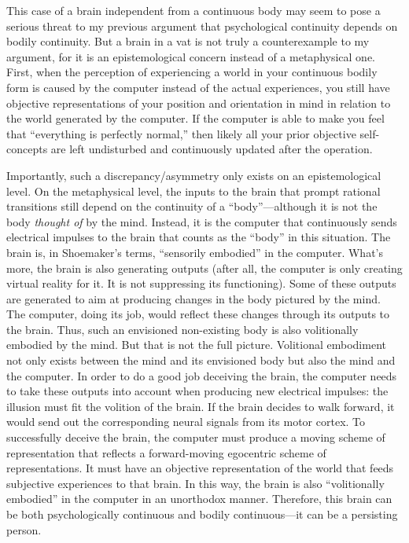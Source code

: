 This case of a brain independent from a continuous body may seem to pose
a serious threat to my previous argument that psychological continuity
depends on bodily continuity. But a brain in a vat is not truly a
counterexample to my argument, for it is an epistemological concern
instead of a metaphysical one. First, when the perception of
experiencing a world in your continuous bodily form is caused by the
computer instead of the actual experiences, you still have objective
representations of your position and orientation in mind in relation to
the world generated by the computer. If the computer is able to make you
feel that ``everything is perfectly normal,'' then likely all your prior
objective self-concepts are left undisturbed and continuously updated
after the operation.

Importantly, such a discrepancy/asymmetry only exists on an
epistemological level. On the metaphysical level, the inputs to the
brain that prompt rational transitions still depend on the continuity of
a ``body''---although it is not the body \emph{thought of} by the
mind. Instead, it is the computer that continuously sends electrical
impulses to the brain that counts as the ``body'' in this situation. The
brain is, in Shoemaker's terms, ``sensorily embodied'' in the computer.
What's more, the brain is also generating outputs (after all, the
computer is only creating virtual reality for it. It is not suppressing
its functioning). Some of these outputs are generated to aim at
producing changes in the body pictured by the mind. The computer, doing
its job, would reflect these changes through its outputs to the brain.
Thus, such an envisioned non-existing body is also volitionally embodied
by the mind. But that is not the full picture. Volitional embodiment not
only exists between the mind and its envisioned body but also the mind
and the computer. In order to do a good job deceiving the brain, the
computer needs to take these outputs into account when producing new
electrical impulses: the illusion must fit the volition of the brain. If
the brain decides to walk forward, it would send out the corresponding
neural signals from its motor cortex. To successfully deceive the brain,
the computer must produce a moving scheme of representation that
reflects a forward-moving egocentric scheme of representations. It must
have an objective representation of the world that feeds subjective
experiences to that brain. In this way, the brain is also ``volitionally
embodied'' in the computer in an unorthodox manner. Therefore, this
brain can be both psychologically continuous and bodily continuous---it
can be a persisting person.

